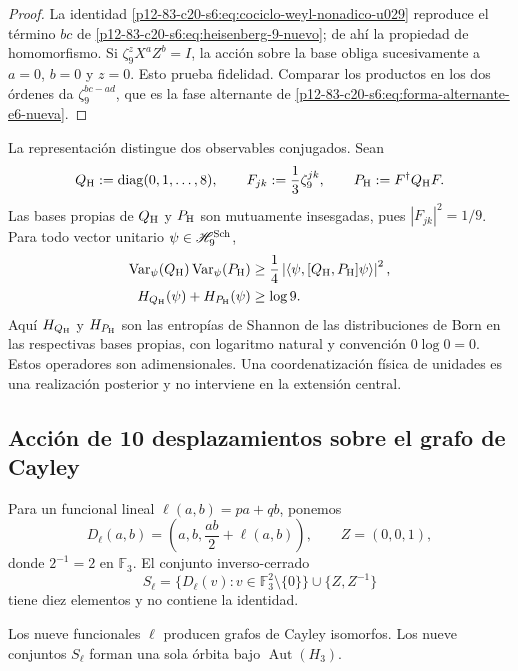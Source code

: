 \begin{proof}
La identidad \eqref{p12-83-c20-s6:eq:cociclo-weyl-nonadico-u029} reproduce el término
\(bc\) de \eqref{p12-83-c20-s6:eq:heisenberg-9-nuevo}; de ahí la propiedad de
homomorfismo. Si \(\zeta_9^zX^aZ^b=I\), la acción sobre la base obliga
sucesivamente a \(a=0\), \(b=0\) y \(z=0\). Esto prueba fidelidad. Comparar
los productos en los dos órdenes da
\(\zeta_9^{bc-ad}\), que es la fase alternante de
\eqref{p12-83-c20-s6:eq:forma-alternante-e6-nueva}.
\end{proof}

La representación distingue dos observables conjugados. Sean
\[
 Q_{\rm H}:=\operatorname{diag}(0,1,\ldots,8),
 \qquad
 F_{jk}:=\frac13\zeta_9^{jk},
 \qquad
 P_{\rm H}:=F^\dagger Q_{\rm H}F.
\]
Las bases propias de \(Q_{\rm H}\) y \(P_{\rm H}\) son mutuamente
insesgadas, pues \(|F_{jk}|^2=1/9\). Para todo vector unitario
\(\psi\in\mathscr H_9^{\rm Sch}\),
\begin{align}
 \operatorname{Var}_\psi(Q_{\rm H})
 \operatorname{Var}_\psi(P_{\rm H})
 &\ge
 \frac14\left|
 \langle\psi,[Q_{\rm H},P_{\rm H}]\psi\rangle
 \right|^2,
 \label{p12-83-c20-s6:eq:incertidumbre-weyl-u029}\\
 H_{Q_{\rm H}}(\psi)+H_{P_{\rm H}}(\psi)
 &\ge\log9.
 \label{p12-83-c20-s6:eq:incertidumbre-entropica-weyl-u029}
\end{align}
Aquí \(H_{Q_{\rm H}}\) y \(H_{P_{\rm H}}\) son las entropías de Shannon
de las distribuciones de Born en las respectivas bases propias,
con logaritmo natural y convención \(0\log0=0\).
Estos operadores son adimensionales. Una coordenatización física de unidades es una
realización posterior y no interviene en la extensión central.

\subsection{Acción de 10 desplazamientos sobre el grafo de Cayley}

Para un funcional lineal
\(\ell(a,b)=pa+qb\), ponemos
\[
 D_\ell(a,b)=\left(a,b,\frac{ab}{2}+\ell(a,b)\right),
 \qquad Z=(0,0,1),
\]
donde \(2^{-1}=2\) en \(\mathbb F_3\). El conjunto inverso-cerrado
\begin{equation}
 S_\ell=
 \{D_\ell(v):v\in\mathbb F_3^2\setminus\{0\}\}
 \cup\{Z,Z^{-1}\}
 \label{p12-83-c20-s6:eq:conjunto-conexion-e6}
\end{equation}
tiene diez elementos y no contiene la identidad.

\begin{theorem}
\label{p12-83-c20-s6:thm:independencia-calibre-e6}
Los nueve funcionales \(\ell\) producen grafos de Cayley isomorfos. Los
nueve conjuntos \(S_\ell\) forman una sola órbita bajo
\(\operatorname{Aut}(H_3)\).
\end{theorem}

